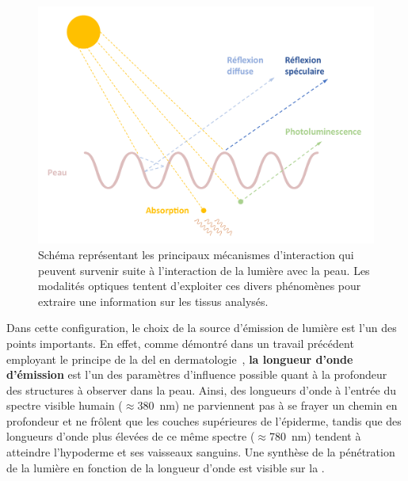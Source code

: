 \begin{figure}[H]
    \centering
    \includegraphics[width=\linewidth]{contents/chapter_2/resources/scheme_light_interaction.pdf}
    \caption{Schéma représentant les principaux mécanismes d'interaction qui peuvent survenir suite à l'interaction de la lumière avec la peau. Les modalités optiques tentent d'exploiter ces divers phénomènes pour extraire une information sur les tissus analysés.}
    \label{fig:scheme_light_interaction}
\end{figure}\par

Dans cette configuration, le choix de la source d'émission de lumière est l'un des points importants. En effet, comme démontré dans un travail précédent employant le principe de la \gls{del} en dermatologie~\cite{Barolet2008}, \textbf{la longueur d'onde d'émission} est l'un des paramètres d'influence possible quant à la profondeur des structures à observer dans la peau. Ainsi, des longueurs d'onde à l'entrée du spectre visible humain ($\approx$\SI{380}{\nano\metre}) ne parviennent pas à se frayer un chemin en profondeur et ne frôlent que les couches supérieures de l'épiderme, tandis que des longueurs d'onde plus élevées de ce même spectre ($\approx$\SI{780}{\nano\metre}) tendent à atteindre l'hypoderme et ses vaisseaux sanguins. Une synthèse de la pénétration de la lumière en fonction de la longueur d'onde est visible sur la .\par

